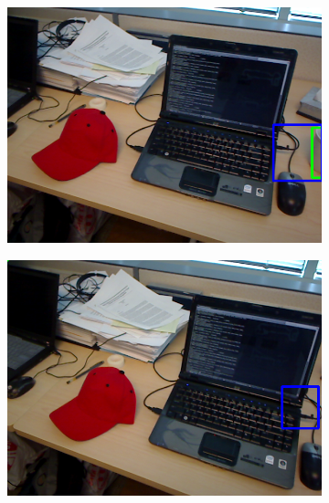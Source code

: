 \begin{figure}
	\begin{subfigure}[b]{0.3\textwidth}
		\includegraphics[width=\textwidth]{img/seguimiento_solo_frame/solo_frame-desk_1-coffee_mug_5-frame_32.png}
	\end{subfigure}
	\begin{subfigure}[b]{0.3\textwidth}
		\includegraphics[width=\textwidth]{img/seguimiento_solo_frame/solo_frame-desk_1-coffee_mug_5-frame_33.png}
	\end{subfigure}
	\begin{subfigure}[b]{0.3\textwidth}

\end{subfigure}
\end{figure}
